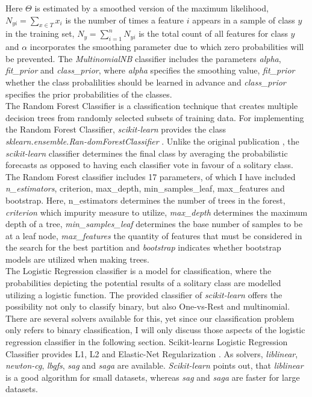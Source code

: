 \documentclass[a4paper, 11pt,titlepage,oneside,openany]{book}
\begin{document}
\noindent Here $\Theta$ is estimated by a smoothed version of the maximum likelihood, $N_{yi}=\sum_{x \in T}x_i$ is the number of times a feature $i$ appears in a sample of class $y$ in the training set, $N_y=\sum_{i=1}^{n}N_{yi}$ is the total count of all features for class $y$ and $\alpha$ incorporates the smoothing parameter due to which zero probabilities will be prevented.
The \textit{MultinomialNB} classifier includes the parameters \textit{alpha}, \textit{fit\_prior} and \textit{class\_prior}, where \textit{alpha} specifies the smoothing value, \textit{fit\_prior} whether the class probalilities should be learned in advance and \textit{class\_prior} specifies the prior probabilities of the classes.\\
\indent The Random Forest Classifier is a classification technique that creates multiple decision trees from randomly selected subsets of training data. For implementing the Random Forest Classifier, \textit{scikit-learn} provides the class \textit{sklearn.ensemble.Ran-domForestClassifier} \cite{coderandomforest}. Unlike the original publication \cite{randomforest}, the \textit{scikit-learn} classifier determines the final class by averaging the probabilistic forecasts as opposed to having each classifier vote in favour of a solitary class. The Random Forest classifier includes 17 parameters, of which I have included \textit{n\_estimators}, criterion, max\_depth, min\_samples\_leaf, max\_features and bootstrap. Here, n\_estimators determines the number of trees in the forest, \textit{criterion} which impurity measure to utilize, \textit{max\_depth} determines the maximum depth of a tree, \textit{min\_samples\_leaf} determines the base number of samples to be at a leaf node, \textit{max\_features} the quantity of features that must be considered in the search for the best partition and \textit{bootstrap} indicates whether bootstrap models are utilized when making trees.\\
\indent The Logistic Regression classifier is a model for classification, where the probabilities depicting the potential results of a solitary class are modelled utilizing a logistic function. The provided classifier of \textit{scikit-learn} offers the possibility not only to classify binary, but also One-vs-Rest and multinomial. There are several solvers available for this, yet since our classification problem only refers to binary classification, I will only discuss those aspects of the logistic regression classifier in the following section. Scikit-learns Logistic Regression Classifier provides L1, L2 and Elastic-Net Regularization \cite{logisticregression}. As solvers, \textit{liblinear}, \textit{newton-cg}, \textit{lbgfs}, \textit{sag} and \textit{saga} are available. \textit{Scikit-learn} points out, that \textit{liblinear} is a good algorithm for small datasets, whereas \textit{sag} and \textit{saga} are faster for large datasets. 
\end{document}
